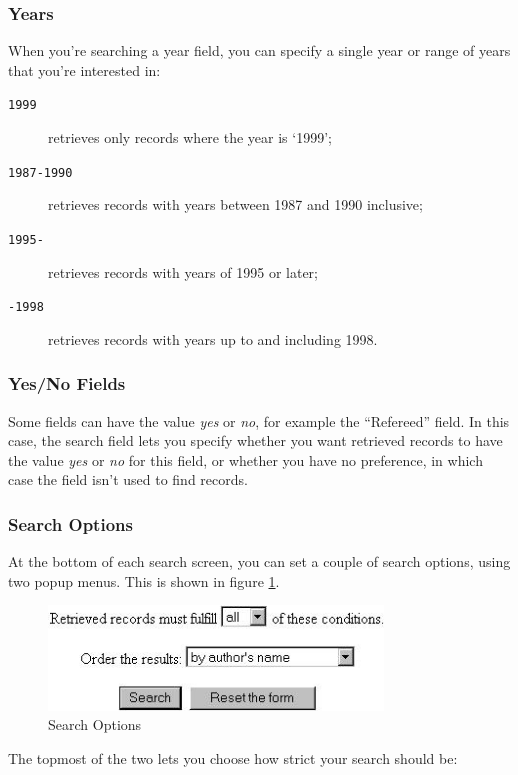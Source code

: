 \subsubsection{Years}

When you're searching a year field, you can specify a single year or range of years that you're interested in:

\begin{description}
\item[{\tt 1999}] retrieves only records where the year is `1999';
\item[{\tt 1987-1990}] retrieves records with years between 1987 and 1990 inclusive;
\item[{\tt 1995-}] retrieves records with years of 1995 or later;
\item[{\tt -1998}] retrieves records with years up to and including 1998.
\end{description}


\subsubsection{Yes/No Fields}

Some fields can have the value \emph{yes} or \emph{no}, for example the ``Refereed'' field. In this case, the search field lets you specify whether you want retrieved records to have the value \emph{yes} or \emph{no} for this field, or whether you have no preference, in which case the field isn't used to find records.


\subsubsection{Search Options}

At the bottom of each search screen, you can set a couple of search options, using two popup menus. This is shown in figure \ref{search_options}.

\begin{figure}
\centerline{\includegraphics[width=3.5in]{images/search-options}}
\caption{\label{search_options} Search Options}
\end{figure}

The topmost of the two lets you choose how strict your search should be:

